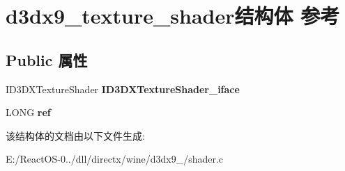 \hypertarget{structd3dx9__texture__shader}{}\section{d3dx9\+\_\+texture\+\_\+shader结构体 参考}
\label{structd3dx9__texture__shader}
\subsection*{Public 属性}
\begin{DoxyCompactItemize}
\item 
\mbox{\label{structd3dx9__texture__shader_a7747f50f0dd015d484c7ee49ef81639d}} 
I\+D3\+D\+X\+Texture\+Shader {\bfseries I\+D3\+D\+X\+Texture\+Shader\+\_\+iface}
\item 
\mbox{\label{structd3dx9__texture__shader_a0478344e86a89403b9057a7b6259ca5d}} 
L\+O\+NG {\bfseries ref}
\end{DoxyCompactItemize}


该结构体的文档由以下文件生成\+:\begin{DoxyCompactItemize}
\item 
E\+:/\+React\+O\+S-\/0../dll/directx/wine/d3dx9\+\_/shader.\+c\end{DoxyCompactItemize}
